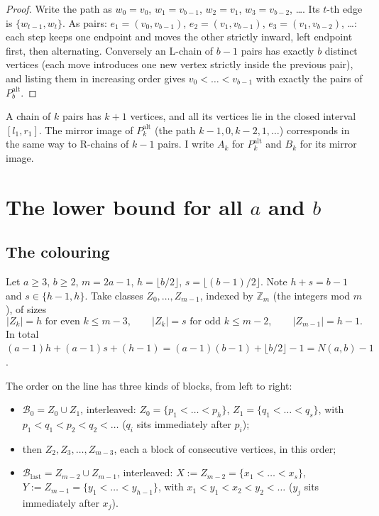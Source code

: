 \documentclass[11pt]{article}
\newcommand{\Palt}[1]{P_{#1}^{\mathrm{alt}}}
\newcommand{\Bfirst}{\mathcal{B}_0}
\newcommand{\Blast}{\mathcal{B}_{\mathrm{last}}}
\theoremstyle{plain}
\theoremstyle{remark}
\begin{document}
\begin{proof}
Write the path as $w_0 = v_0$, $w_1 = v_{b-1}$, $w_2 = v_1$, $w_3 = v_{b-2}$, \dots. Its $t$-th edge is
$\{w_{t-1}, w_t\}$. As pairs: $e_1 = (v_0, v_{b-1})$, $e_2 = (v_1, v_{b-1})$, $e_3 = (v_1, v_{b-2})$, \dots: each
step keeps one endpoint and moves the other strictly inward, left endpoint first, then alternating. Conversely
an L-chain of $b-1$ pairs has exactly $b$ distinct vertices (each move introduces one new vertex strictly inside
the previous pair), and listing them in increasing order gives $v_0 < \dots < v_{b-1}$ with exactly the pairs of
$\Palt{b}$.
\end{proof}

A chain of $k$ pairs has $k+1$ vertices, and all its vertices lie in the closed interval $[l_1, r_1]$. The mirror
image of $\Palt{k}$ (the path $k-1, 0, k-2, 1, \dots$) corresponds in the same way to R-chains of $k-1$ pairs.
I write $A_k$ for $\Palt{k}$ and $B_k$ for its mirror image.

\section{The lower bound for all $a$ and $b$}

\subsection{The colouring}

Let $a \geq 3$, $b \geq 2$, $m = 2a-1$, $h = \lfloor b/2 \rfloor$, $s = \lfloor (b-1)/2 \rfloor$. Note
$h + s = b-1$ and $s \in \{h-1, h\}$. Take classes $Z_0, \dots, Z_{m-1}$, indexed by $\mathbb{Z}_m$ (the integers
mod $m$), of sizes
\[
  |Z_k| = h \text{ for even } k \leq m-3, \qquad |Z_k| = s \text{ for odd } k \leq m-2, \qquad |Z_{m-1}| = h-1 .
\]
In total $(a-1)h + (a-1)s + (h-1) = (a-1)(b-1) + \lfloor b/2 \rfloor - 1 = N(a,b) - 1$.

The order on the line has three kinds of blocks, from left to right:
\begin{itemize}
  \item $\Bfirst = Z_0 \cup Z_1$, interleaved: $Z_0 = \{p_1 < \dots < p_h\}$, $Z_1 = \{q_1 < \dots < q_s\}$, with
  $p_1 < q_1 < p_2 < q_2 < \dots$ ($q_i$ sits immediately after $p_i$);
  \item then $Z_2, Z_3, \dots, Z_{m-3}$, each a block of consecutive vertices, in this order;
  \item $\Blast = Z_{m-2} \cup Z_{m-1}$, interleaved: $X := Z_{m-2} = \{x_1 < \dots < x_s\}$,
  $Y := Z_{m-1} = \{y_1 < \dots < y_{h-1}\}$, with $x_1 < y_1 < x_2 < y_2 < \dots$ ($y_j$ sits immediately after
  $x_j$).
\end{itemize}
\end{document}

